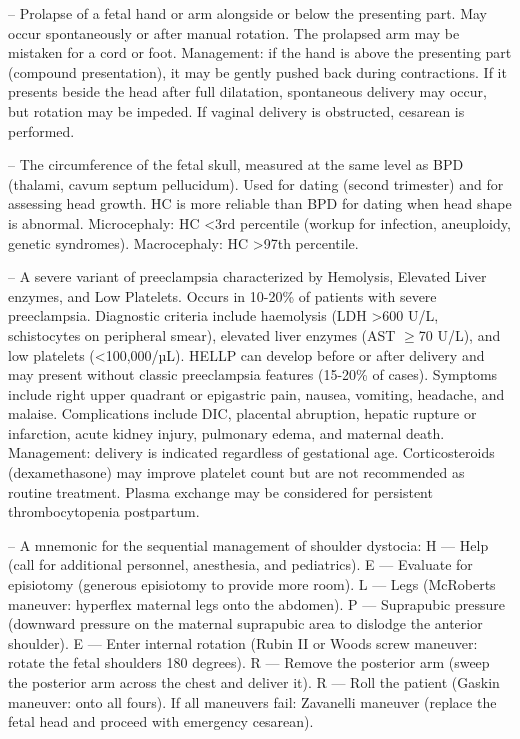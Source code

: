 -- Prolapse of a fetal hand or arm alongside or below the presenting part. May occur spontaneously or after manual rotation. The prolapsed arm may be mistaken for a cord or foot. Management: if the hand is above the presenting part (compound presentation), it may be gently pushed back during contractions. If it presents beside the head after full dilatation, spontaneous delivery may occur, but rotation may be impeded. If vaginal delivery is obstructed, cesarean is performed.

-- The circumference of the fetal skull, measured at the same level as BPD (thalami, cavum septum pellucidum). Used for dating (second trimester) and for assessing head growth. HC is more reliable than BPD for dating when head shape is abnormal. Microcephaly: HC <3rd percentile (workup for infection, aneuploidy, genetic syndromes). Macrocephaly: HC >97th percentile.

-- A severe variant of preeclampsia characterized by Hemolysis, Elevated Liver enzymes, and Low Platelets. Occurs in 10-20\% of patients with severe preeclampsia. Diagnostic criteria include haemolysis (LDH >600 U/L, schistocytes on peripheral smear), elevated liver enzymes (AST \(\ge\)70 U/L), and low platelets (<100,000/µL). HELLP can develop before or after delivery and may present without classic preeclampsia features (15-20\% of cases). Symptoms include right upper quadrant or epigastric pain, nausea, vomiting, headache, and malaise. Complications include DIC, placental abruption, hepatic rupture or infarction, acute kidney injury, pulmonary edema, and maternal death. Management: delivery is indicated regardless of gestational age. Corticosteroids (dexamethasone) may improve platelet count but are not recommended as routine treatment. Plasma exchange may be considered for persistent thrombocytopenia postpartum.

-- A mnemonic for the sequential management of shoulder dystocia: H — Help (call for additional personnel, anesthesia, and pediatrics). E — Evaluate for episiotomy (generous episiotomy to provide more room). L — Legs (McRoberts maneuver: hyperflex maternal legs onto the abdomen). P — Suprapubic pressure (downward pressure on the maternal suprapubic area to dislodge the anterior shoulder). E — Enter internal rotation (Rubin II or Woods screw maneuver: rotate the fetal shoulders 180 degrees). R — Remove the posterior arm (sweep the posterior arm across the chest and deliver it). R — Roll the patient (Gaskin maneuver: onto all fours). If all maneuvers fail: Zavanelli maneuver (replace the fetal head and proceed with emergency cesarean).

